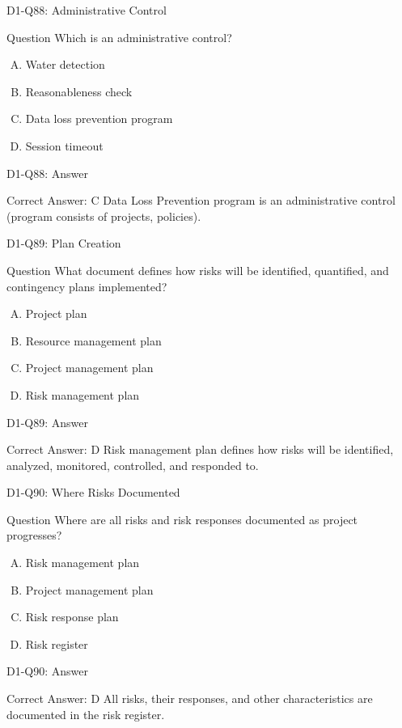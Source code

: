 \documentclass{beamer}
\begin{document}
	\begin{frame}{D1-Q88: Administrative Control}
		\begin{block}{Question}
			Which is an administrative control?
		\end{block}
		\begin{enumerate}[(A)]
			\item Water detection
			\item Reasonableness check
			\item Data loss prevention program
			\item Session timeout
		\end{enumerate}
	\end{frame}
	\begin{frame}{D1-Q88: Answer}
		\begin{block}{Correct Answer: C}
			Data Loss Prevention program is an administrative control (program consists of projects, policies).
		\end{block}
	\end{frame}
	
	\begin{frame}{D1-Q89: Plan Creation}
		\begin{block}{Question}
			What document defines how risks will be identified, quantified, and contingency plans implemented?
		\end{block}
		\begin{enumerate}[(A)]
			\item Project plan
			\item Resource management plan
			\item Project management plan
			\item Risk management plan
		\end{enumerate}
	\end{frame}
	\begin{frame}{D1-Q89: Answer}
		\begin{block}{Correct Answer: D}
			Risk management plan defines how risks will be identified, analyzed, monitored, controlled, and responded to.
		\end{block}
	\end{frame}
	
	\begin{frame}{D1-Q90: Where Risks Documented}
		\begin{block}{Question}
			Where are all risks and risk responses documented as project progresses?
		\end{block}
		\begin{enumerate}[(A)]
			\item Risk management plan
			\item Project management plan
			\item Risk response plan
			\item Risk register
		\end{enumerate}
	\end{frame}
	\begin{frame}{D1-Q90: Answer}
		\begin{block}{Correct Answer: D}
			All risks, their responses, and other characteristics are documented in the risk register.
		\end{block}
	\end{frame}
	
\end{document}
